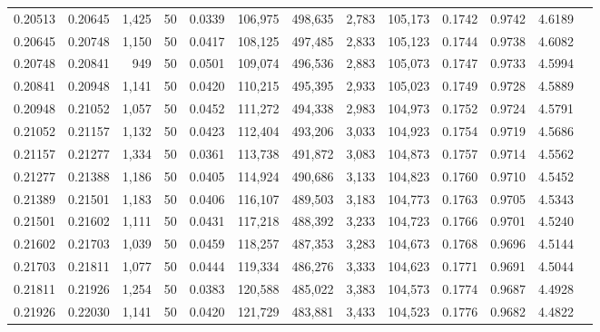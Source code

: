 \begin{tabular}{rrrrrrrrrrrrr}
0.20513 & 0.20645 & 1,425 &  50 &                                     0.0339 & 106,975 & 498,635 &   2,783 & 105,173 & 0.1742 & 0.9742 & 4.6189 \\
0.20645 & 0.20748 & 1,150 &  50 &                                     0.0417 & 108,125 & 497,485 &   2,833 & 105,123 & 0.1744 & 0.9738 & 4.6082 \\
0.20748 & 0.20841 &   949 &  50 &                                     0.0501 & 109,074 & 496,536 &   2,883 & 105,073 & 0.1747 & 0.9733 & 4.5994 \\
0.20841 & 0.20948 & 1,141 &  50 &                                     0.0420 & 110,215 & 495,395 &   2,933 & 105,023 & 0.1749 & 0.9728 & 4.5889 \\
0.20948 & 0.21052 & 1,057 &  50 &                                     0.0452 & 111,272 & 494,338 &   2,983 & 104,973 & 0.1752 & 0.9724 & 4.5791 \\
0.21052 & 0.21157 & 1,132 &  50 &                                     0.0423 & 112,404 & 493,206 &   3,033 & 104,923 & 0.1754 & 0.9719 & 4.5686 \\
0.21157 & 0.21277 & 1,334 &  50 &                                     0.0361 & 113,738 & 491,872 &   3,083 & 104,873 & 0.1757 & 0.9714 & 4.5562 \\
0.21277 & 0.21388 & 1,186 &  50 &                                     0.0405 & 114,924 & 490,686 &   3,133 & 104,823 & 0.1760 & 0.9710 & 4.5452 \\
0.21389 & 0.21501 & 1,183 &  50 &                                     0.0406 & 116,107 & 489,503 &   3,183 & 104,773 & 0.1763 & 0.9705 & 4.5343 \\
0.21501 & 0.21602 & 1,111 &  50 &                                     0.0431 & 117,218 & 488,392 &   3,233 & 104,723 & 0.1766 & 0.9701 & 4.5240 \\
0.21602 & 0.21703 & 1,039 &  50 &                                     0.0459 & 118,257 & 487,353 &   3,283 & 104,673 & 0.1768 & 0.9696 & 4.5144 \\
0.21703 & 0.21811 & 1,077 &  50 &                                     0.0444 & 119,334 & 486,276 &   3,333 & 104,623 & 0.1771 & 0.9691 & 4.5044 \\
0.21811 & 0.21926 & 1,254 &  50 &                                     0.0383 & 120,588 & 485,022 &   3,383 & 104,573 & 0.1774 & 0.9687 & 4.4928 \\
0.21926 & 0.22030 & 1,141 &  50 &                                     0.0420 & 121,729 & 483,881 &   3,433 & 104,523 & 0.1776 & 0.9682 & 4.4822 \\

\end{tabular}
